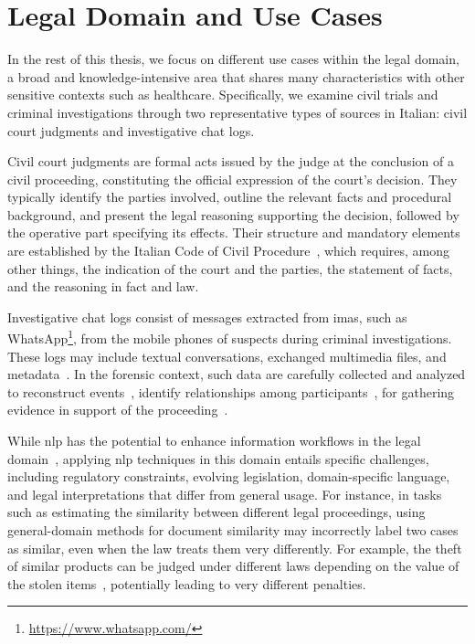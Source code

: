 \section{Legal Domain and Use Cases}
In the rest of this thesis, we focus on different use cases within the legal domain, a broad and knowledge-intensive area that shares many characteristics with other sensitive contexts such as healthcare. Specifically, we examine civil trials and criminal investigations through two representative types of sources in Italian: civil court judgments and investigative chat logs.

Civil court judgments are formal acts issued by the judge at the conclusion of a civil proceeding, constituting the official expression of the court's decision. They typically identify the parties involved, outline the relevant facts and procedural background, and present the legal reasoning supporting the decision, followed by the operative part specifying its effects. Their structure and mandatory elements are established by the Italian Code of Civil Procedure~\cite[Art.~132]{CPC}, which requires, among other things, the indication of the court and the parties, the statement of facts, and the reasoning in fact and law.

Investigative chat logs consist of messages extracted from \acp{ima}, such as WhatsApp\footnote{\url{https://www.whatsapp.com/}}, from the mobile phones of suspects during criminal investigations. These logs may include textual conversations, exchanged multimedia files, and metadata~\cite{P_rez_2021}. In the forensic context, such data are carefully collected and analyzed to reconstruct events~\cite{P_rez_2021}, identify relationships among participants~\cite{Sonakshi_whatsapp_group_2025}, for gathering evidence in support of the proceeding~\cite{pirzada2024framework}.

While \ac{nlp} has the potential to enhance information workflows in the legal domain~\cite{juliahb2024}, applying \ac{nlp} techniques in this domain entails specific challenges, including regulatory constraints, evolving legislation, domain-specific language, and legal interpretations that differ from general usage.
%
For instance, in tasks such as estimating the similarity between different legal proceedings, using general-domain methods for document similarity may incorrectly label two cases as similar, even when the law treats them very differently. For example, the theft of similar products can be judged under different laws depending on the value of the stolen items~\cite{feng-etal-2024-legal}, potentially leading to very different penalties.

